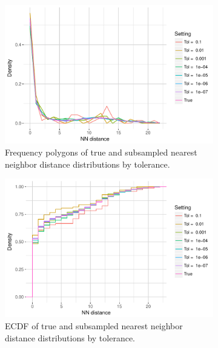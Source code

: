 \documentclass{article}
\begin{document}
\begin{figure}
    \begin{subfigure}{.49\textwidth}
        \includegraphics[width=\linewidth]{Figures/NearestNeighbor/CDR3/freqpoly_by_tol.pdf}
   		\caption{Frequency polygons of true and subsampled nearest neighbor distance distributions by tolerance.}
    	\label{fig:NNFreqPoly}
    \end{subfigure}
    \begin{subfigure}{.49\textwidth}
        \includegraphics[width=\linewidth]{Figures/NearestNeighbor/CDR3/ecdf_by_tol.pdf}
    	\caption{ECDF of true and subsampled nearest neighbor distance distributions by tolerance.}
    	\label{fig:NNECDF}
    \end{subfigure}
    \begin{subfigure}[b]{.49\textwidth}

\end{subfigure}
\end{figure}
\end{document}
